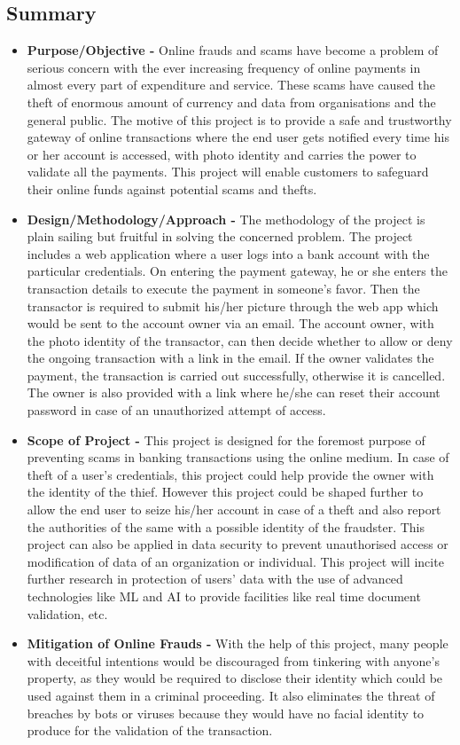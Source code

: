 \documentclass[12pt, oneside, a4paper]{article}
\begin{document}
\subsection{Summary}
\begin{itemize}
    \item \textbf{Purpose/Objective - }Online frauds and scams have become a problem of serious concern with the ever increasing frequency of online payments in almost every part of expenditure and service. These scams have caused the theft of enormous amount of currency and data from organisations and the general public. The motive of this project is to provide a safe and trustworthy gateway of online transactions where the end user gets notified every time his or her account is accessed, with photo identity and  carries the power to validate all the payments. This project will enable customers to safeguard their online funds against potential scams and thefts.
    \item \textbf{Design/Methodology/Approach - }The methodology of the project is plain sailing but fruitful in solving the concerned problem. The project includes a web application where a user logs into a bank account with the particular credentials. On entering the payment gateway, he or she enters the transaction details to execute the payment in someone's favor. Then the transactor is required to submit his/her picture through the web app which would be sent to the account owner via an email. The account owner, with the photo identity of the transactor, can then decide whether to allow or deny the ongoing transaction with a link in the email. If the owner validates the payment, the transaction is carried out successfully, otherwise it is cancelled. The owner is also provided with a link where he/she can reset their account password in case of an unauthorized attempt of access.
    \item \textbf{Scope of Project - }This project is designed for the foremost purpose of preventing scams in banking transactions using the online medium. In case of theft of a user's credentials, this project could help provide the owner with the identity of the thief. However this project could be shaped further to allow the end user to seize his/her account in case of a theft and also report the authorities of the same with a possible identity of the fraudster. This project can also be applied in data security to prevent unauthorised access or modification of data of an organization or individual. This project will incite further research in protection of users' data with the use of advanced technologies like ML and AI to provide facilities like real time document validation, etc.
    \item \textbf{Mitigation of Online Frauds - }With the help of this project, many people with deceitful intentions would be discouraged from tinkering with anyone's property, as they would be required to disclose their identity which could be used against them in a criminal proceeding. It also eliminates the threat of breaches by bots or viruses because they would have no facial identity to produce for the validation of the transaction. 
\end{itemize}
\pagebreak
\end{document}
